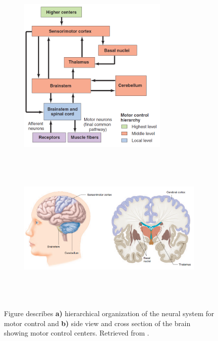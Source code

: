 \begin{figure}[htb!]
    \centering
    \begin{subfigure}[t]{0.95\textwidth}
        \centering
        \includegraphics[height=3in]{Images/introduction/control.png}
        \caption{}
    \end{subfigure}%
    
    \begin{subfigure}[t]{0.95\textwidth}
        \centering
        \includegraphics[height=3in]{Images/introduction/control2.png}
        \caption{}
    \end{subfigure}
    \caption{Figure describes \textbf{a)} hierarchical organization of the neural system for motor control and \textbf{b)} side view and cross section of the brain showing motor control centers. Retrieved from \citet{Widmaier2014}.}
\label{fig:brain_centers}
\end{figure}

